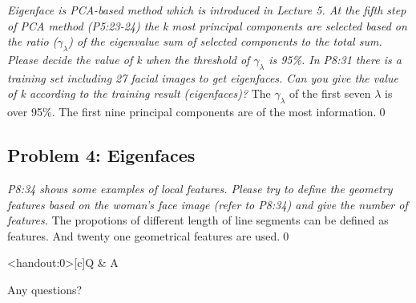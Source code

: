 \documentclass[
        ]{beamer}
\begin{document}
    		\begin{frame}[t]{\subsecname}
    			\begin{overprint}
    			\emph{Eigenface is PCA-based method which is introduced in Lecture 5. At the fifth step of PCA method (P5:23-24) the k most principal components are selected based on the ratio ($\gamma_{\lambda}$) of the eigenvalue sum of selected components to the total sum. Please decide the value of k when the threshold of $\gamma_{\lambda}$ is 95\%. In P8:31 there is a training set including 27 facial images to get eigenfaces. Can you give the value of k according to the training result (eigenfaces)?}
    				\onslide<2>  %
    				\onslide<3>  %
    				The $\gamma_{\lambda}$ of the first seven $\lambda$ is over 95\%.
    				\onslide<4>  %
    				\small{The first nine principal components are of the most information.}\qed
    			\end{overprint}
    		\end{frame}
    		
    \subsection{Problem 4: Eigenfaces}
    
    		\begin{frame}[t]{\subsecname}
    			\begin{overprint}
    			\onslide<1>
    			\emph{P8:34 shows some examples of local features. Please try to define the geometry features based on the woman's face image (refer to P8:34) and give the number of features.}
    				\onslide<2> \inpdfc{8}{34} 
    				\small{The propotions of different length of line segments can be defined as features. And twenty one geometrical features are used.}\qed
    			\end{overprint}
    		\end{frame}   


    \begin{frame}<handout:0>[c]{Q \& A}
        \centerline{\Large{Any questions?}}
    \end{frame}
    
    
    
\end{document}
